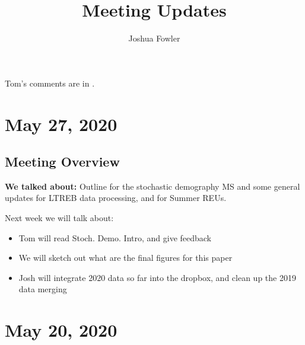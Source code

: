 \documentclass{article}
\title{Meeting Updates}
\author{Joshua Fowler}
\newcommand{\tom}[1]{{\textit{\color{WildStrawberry}{[#1]}}}}
\begin{document}
%
  \maketitle
  Tom's comments are in \tom{WildStrawberry}.
  
\section*{May 27, 2020}
\subsection*{Meeting Overview}
\textbf{We talked about:}
Outline for the stochastic demography MS and some general updates for LTREB data processing, and for Summer REUs. 

Next week we will talk about:
\begin{itemize}
\item{Tom will read Stoch. Demo. Intro, and give feedback}
\item{We will sketch out what are the final figures for this paper}
\item{Josh will integrate 2020 data so far into the dropbox, and clean up the 2019 data merging}
\end{itemize}

\section*{May 20, 2020}
\end{document}
